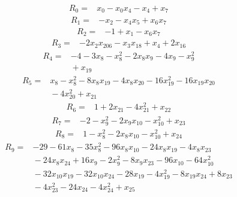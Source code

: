 {\small
\setlength{\jot}{2pt}
\allowdisplaybreaks[0]
\begin{align*}
R_{0} ={}& x_{0} - x_{0} x_{4} - x_{4} + x_{7}
\end{align*}
\begin{align*}
R_{1} ={}& -x_{2} - x_{4} x_{5} + x_{6} x_{7}
\end{align*}
\begin{align*}
R_{2} ={}& -1 + x_{1} - x_{6} x_{7}
\end{align*}
\begin{align*}
R_{3} ={}& -2x_{2} x_{206} - x_{3} x_{18} + x_{4} + 2x_{16}
\end{align*}
\begin{align*}
R_{4} ={}& -4 - 3x_{8} - x_{8}^{2} - 2x_{8} x_{9} - 4x_{9} - x_{9}^{2} \\
&{}  + x_{19}
\end{align*}
\begin{align*}
R_{5} ={}& x_{8} - x_{8}^{2} - 8x_{8} x_{19} - 4x_{8} x_{20} - 16x_{19}^{2} - 16x_{19} x_{20} \\
&{}  - 4x_{20}^{2} + x_{21}
\end{align*}
\begin{align*}
R_{6} ={}& 1 + 2x_{21} - 4x_{21}^{2} + x_{22}
\end{align*}
\begin{align*}
R_{7} ={}& -2 - x_{9}^{2} - 2x_{9} x_{10} - x_{10}^{2} + x_{23}
\end{align*}
\begin{align*}
R_{8} ={}& 1 - x_{8}^{2} - 2x_{8} x_{10} - x_{10}^{2} + x_{24}
\end{align*}
\begin{align*}
R_{9} ={}& -29 - 61x_{8} - 35x_{8}^{2} - 96x_{8} x_{10} - 24x_{8} x_{19} - 4x_{8} x_{23} \\
&{}  - 24x_{8} x_{24} + 16x_{9} - 2x_{9}^{2} - 8x_{9} x_{23} - 96x_{10} - 64x_{10}^{2} \\
&{}  - 32x_{10} x_{19} - 32x_{10} x_{24} - 28x_{19} - 4x_{19}^{2} - 8x_{19} x_{24} + 8x_{23} \\
&{}  - 4x_{23}^{2} - 24x_{24} - 4x_{24}^{2} + x_{25}
\end{align*}
}
